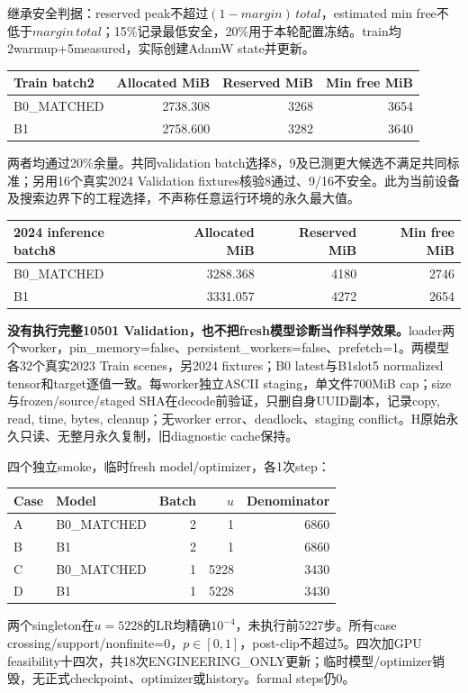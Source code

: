 \documentclass[10pt,a4paper,fontset=windows]{ctexart}
\begin{document}
继承安全判据：reserved peak不超过$(1-margin)\,total$，estimated min free不低于$margin\,total$；15\%记录最低安全，20\%用于本轮配置冻结。train均2warmup+5measured，实际创建AdamW state并更新。
\begin{center}\begin{tabular}{lrrr}\toprule
Train batch2 & Allocated MiB & Reserved MiB & Min free MiB\\\midrule
B0\_MATCHED & 2738.308 & 3268 & 3654 \\
B1 & 2758.600 & 3282 & 3640 \\
\bottomrule\end{tabular}\end{center}
两者均通过20\%余量。共同validation batch选择8，9及已测更大候选不满足共同标准；另用16个真实2024 Validation fixtures核验8通过、9/16不安全。此为当前设备及搜索边界下的工程选择，不声称任意运行环境的永久最大值。
\begin{center}\begin{tabular}{lrrr}\toprule
2024 inference batch8 & Allocated MiB & Reserved MiB & Min free MiB\\\midrule
B0\_MATCHED & 3288.368 & 4180 & 2746 \\
B1 & 3331.057 & 4272 & 2654 \\
\bottomrule\end{tabular}\end{center}
\textbf{没有执行完整10501 Validation，也不把fresh模型诊断当作科学效果。}loader两个worker，pin\_memory=false、persistent\_workers=false、prefetch=1。两模型各32个真实2023 Train scenes，另2024 fixtures；B0 latest与B1slot5 normalized tensor和target逐值一致。每worker独立ASCII staging，单文件700MiB cap；size与frozen/source/staged SHA在decode前验证，只删自身UUID副本，记录copy, read, time, bytes, cleanup；无worker error、deadlock、staging conflict。H原始永久只读、无整月永久复制，旧diagnostic cache保持。

四个独立smoke，临时fresh model/optimizer，各1次step：
\begin{center}\begin{tabular}{llrrr}\toprule
Case & Model & Batch & $u$ & Denominator\\\midrule
A & B0\_MATCHED & 2 & 1 & 6860 \\
B & B1 & 2 & 1 & 6860 \\
C & B0\_MATCHED & 1 & 5228 & 3430 \\
D & B1 & 1 & 5228 & 3430 \\
\bottomrule\end{tabular}\end{center}
两个singleton在$u=5228$的LR均精确$10^{-4}$，未执行前5227步。所有case crossing/support/nonfinite=0，$p\in[0,1]$，post-clip不超过5。四次加GPU feasibility十四次，共18次ENGINEERING\_ONLY更新；临时模型/optimizer销毁，无正式checkpoint、optimizer或history。formal steps仍0。
\end{document}
